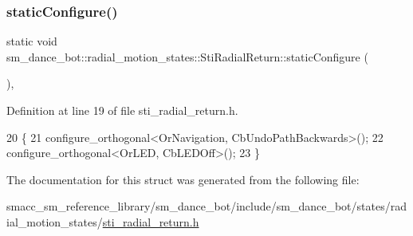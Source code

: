\subsubsection{\texorpdfstring{static\+Configure()}{staticConfigure()}}
{\footnotesize\ttfamily static void sm\+\_\+dance\+\_\+bot\+::radial\+\_\+motion\+\_\+states\+::\+Sti\+Radial\+Return\+::static\+Configure (\begin{DoxyParamCaption}{ }\end{DoxyParamCaption})\hspace{0.3cm}{\ttfamily [inline]}, {\ttfamily [static]}}



Definition at line 19 of file sti\+\_\+radial\+\_\+return.\+h.


\begin{DoxyCode}
20   \{
21     configure\_orthogonal<OrNavigation, CbUndoPathBackwards>();
22     configure\_orthogonal<OrLED, CbLEDOff>();
23   \}
\end{DoxyCode}


The documentation for this struct was generated from the following file\+:\begin{DoxyCompactItemize}
\item 
smacc\+\_\+sm\+\_\+reference\+\_\+library/sm\+\_\+dance\+\_\+bot/include/sm\+\_\+dance\+\_\+bot/states/radial\+\_\+motion\+\_\+states/\hyperlink{sm__dance__bot_2include_2sm__dance__bot_2states_2radial__motion__states_2sti__radial__return_8h}{sti\+\_\+radial\+\_\+return.\+h}\end{DoxyCompactItemize}

